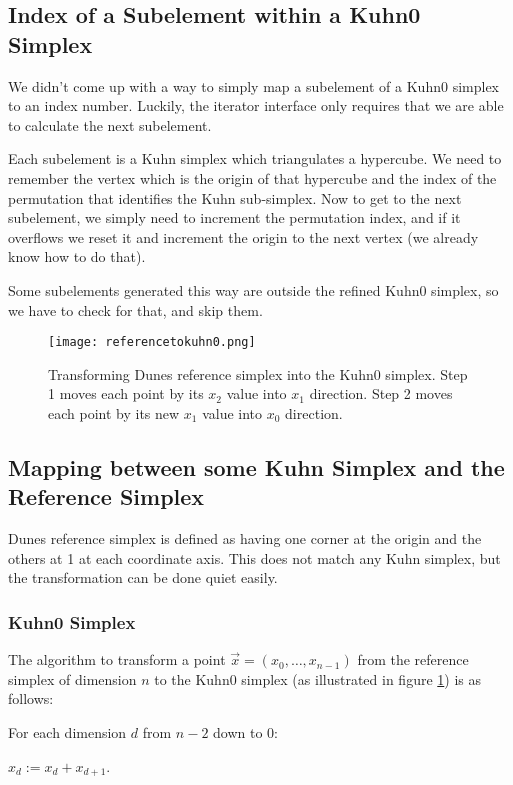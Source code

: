 \documentclass[english,a4paper]{article}
\begin{document}
\subsection{Index of a Subelement within a Kuhn0 Simplex}

We didn't come up with a way to simply map a subelement of a Kuhn0
simplex to an index number.  Luckily, the iterator interface only
requires that we are able to calculate the next subelement.

Each subelement is a Kuhn simplex which triangulates a hypercube.  We
need to remember the vertex which is the origin of that hypercube and
the index of the permutation that identifies the Kuhn sub-simplex.  Now
to get to the next subelement, we simply need to increment the
permutation index, and if it overflows we reset it and increment the
origin to the next vertex (we already know how to do that).

Some subelements generated this way are outside the refined Kuhn0
simplex, so we have to check for that, and skip them.

\begin{figure}
  \centering
  \texttt{[image: referencetokuhn0.png]}
  \caption{\label{ref2kuhn0} Transforming Dunes reference simplex into
    the Kuhn0 simplex.  Step 1 moves each point by its $x_2$ value
    into $x_1$ direction.  Step 2 moves each point by its new $x_1$
    value into $x_0$ direction.}
\end{figure}

\subsection{Mapping between some Kuhn Simplex and the Reference Simplex}

Dunes reference simplex is defined as having one corner at the origin
and the others at 1 at each coordinate axis.  This does not match any
Kuhn simplex, but the transformation can be done quiet easily.

\subsubsection{Kuhn0 Simplex}

The algorithm to transform a point $\vec{x}=(x_0,\ldots,x_{n-1})$ from
the reference simplex of dimension $n$ to the Kuhn0 simplex (as
illustrated in figure \ref{ref2kuhn0}) is as follows:
\begin{compactitem}
\item For each dimension $d$ from $n-2$ down to 0:
  \begin{compactitem}
  \item $x_d:=x_d+x_{d+1}$.
  \end{compactitem}
\end{compactitem}\vspace{2ex}
\end{document}
